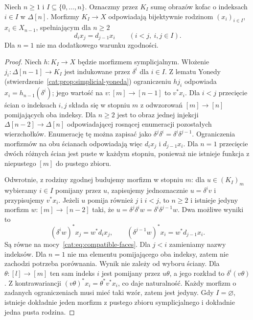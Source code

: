 \begin{stwierdzenie}\label{cat:prop:simplicial-compatible-faces}
Niech $n\geq1$ i $I\subseteq\{0,\ldots,n\}$. Oznaczmy przez $K_I$ sumę obrazów kofac o indeksach $i\in I$ w $\Delta[n]$. Morfizmy $K_I\to X$ odpowiadają bijektywnie rodzinom $(x_i)_{i\in I}$, $x_i\in X_{n-1}$, spełniającym dla $n\geq2$
\begin{equation}\label{cat:eq:compatible-faces}
 d_i x_j=d_{j-1}x_i\qquad(i<j,\ i,j\in I).
\end{equation}
Dla $n=1$ nie ma dodatkowego warunku zgodności.
\end{stwierdzenie}
\begin{proof}
Niech $h:K_I\to X$ będzie morfizmem symplicjalnym. Włożenie $j_i:\Delta[n-1]\to K_I$ jest indukowane przez $\delta^i$ dla $i\in I$. Z lematu Yonedy (stwierdzenie~\ref{cat:prop:simplicial-yoneda}) ograniczeniu $hj_i$ odpowiada $x_i=h_{n-1}(\delta^i)$; jego wartość na $v:[m]\to[n-1]$ to $v^*x_i$. Dla $i<j$ przecięcie ścian o indeksach $i,j$ składa się w stopniu $m$ z odwzorowań $[m]\to[n]$ pomijających oba indeksy. Dla $n\geq2$ jest to obraz jednej injekcji $\Delta[n-2]\to\Delta[n]$ odpowiadającej rosnącej enumeracji pozostałych wierzchołków. Enumerację tę można zapisać jako $\delta^j\delta^i=\delta^i\delta^{j-1}$. Ograniczenia morfizmów na obu ścianach odpowiadają więc $d_i x_j$ i $d_{j-1}x_i$. Dla $n=1$ przecięcie dwóch różnych ścian jest puste w każdym stopniu, ponieważ nie istnieje funkcja z niepustego $[m]$ do pustego zbioru.

Odwrotnie, z rodziny zgodnej budujemy morfizm w stopniu $m$: dla $u\in (K_I)_m$ wybieramy $i\in I$ pomijany przez $u$, zapisujemy jednoznacznie $u=\delta^i v$ i przypisujemy $v^*x_i$. Jeżeli $u$ pomija również $j$ i $i<j$, to $n\geq2$ i istnieje jedyny morfizm $w:[m]\to[n-2]$ taki, że $u=\delta^j\delta^i w=\delta^i\delta^{j-1}w$. Dwa możliwe wyniki to
\[
 (\delta^i w)^*x_j=w^*d_i x_j,\qquad
 (\delta^{j-1}w)^*x_i=w^*d_{j-1}x_i.
\]
Są równe na mocy~\eqref{cat:eq:compatible-faces}. Dla $j<i$ zamieniamy nazwy indeksów. Dla $n=1$ nie ma elementu pomijającego oba indeksy, zatem nie zachodzi potrzeba porównania. Wynik nie zależy od wyboru ściany. Dla $\theta:[l]\to[m]$ ten sam indeks $i$ jest pomijany przez $u\theta$, a jego rozkład to $\delta^i(v\theta)$. Z kontrawariancji $(v\theta)^*x_i=\theta^*v^*x_i$, co daje naturalność. Każdy morfizm o zadanych ograniczeniach musi mieć taki wzór, zatem jest jedyny. Gdy $I=\varnothing$, istnieje dokładnie jeden morfizm z pustego zbioru symplicjalnego i dokładnie jedna pusta rodzina.
\end{proof}

